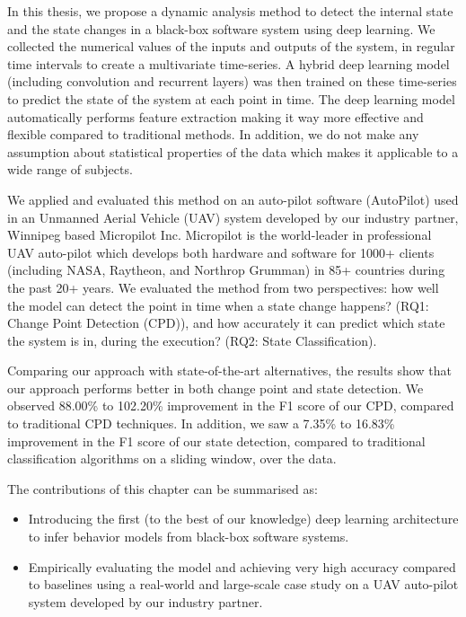 In this thesis, we propose a dynamic analysis method to detect the internal state and the state changes in a black-box software system using deep learning. We collected the numerical values of the inputs and outputs of the system, in regular time intervals to create a multivariate time-series. A hybrid deep learning model (including convolution and recurrent layers) was then trained on these time-series to predict the state of the system at each point in time. The deep learning model automatically performs feature extraction making it way more effective and flexible compared to traditional methods. In addition, we do not make any assumption about statistical properties of the data which makes it applicable to a wide range of subjects.   

We applied and evaluated this method on an auto-pilot software (AutoPilot) used in an Unmanned Aerial Vehicle (UAV) system developed by our industry partner, Winnipeg based Micropilot Inc. Micropilot is the world-leader in professional UAV auto-pilot which develops both hardware and software for 1000+ clients (including NASA, Raytheon, and Northrop Grumman) in 85+ countries during the past 20+ years. 
We evaluated the method from two perspectives: how well the model can detect the point in time when a state change happens? (RQ1: Change Point Detection (CPD)), and how accurately it can predict which state the system is in, during the execution? (RQ2: State Classification). 



Comparing our approach with state-of-the-art alternatives, the results show that our approach performs better in both change point and state detection. We observed 88.00\% to 102.20\% improvement in the F1 score of our CPD, compared to traditional CPD techniques. In addition, we saw a 7.35\% to 16.83\% improvement in the F1 score of our state detection, compared to traditional classification algorithms on a sliding window, over the data.


The contributions of this chapter can be summarised as:
\begin{itemize}
    \item Introducing the first (to the best of our knowledge) deep learning architecture to infer behavior models from black-box software systems.
    \item Empirically evaluating the model and achieving very high accuracy compared to baselines using a real-world and large-scale case study on a UAV auto-pilot system developed by our industry partner.
\end{itemize}

